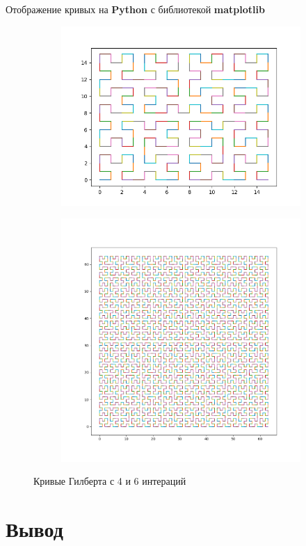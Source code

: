 \documentclass[12pt]{article} %
\begin{document}
Отображение кривых на \textbf{Python} с библиотекой \textbf{matplotlib}
\begin{figure}[H]
\begin{subfigure}[1]{0.4\textwidth}
\centering \includegraphics[width = \textwidth]{hilbert4.png}
\end{subfigure} 
\hfill
\begin{subfigure}[1]{0.6\textwidth}
\centering \includegraphics[width = \textwidth]{hilbert6.png}
\end{subfigure}
\caption{Кривые Гилберта с 4 и 6 интераций}
\end{figure}

\section*{Вывод}
\end{document}
